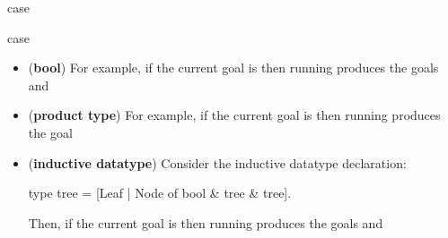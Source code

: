 \begin{tactic}{case}
\begin{tsyntax}{case}
\begin{itemize}
    \item (\textbf{bool})
    For example, if the current goal is
     then
    running 
    produces the goals
    and

    \item (\textbf{product type})
    For example, if the current goal is
     then
    running 
    produces the goal

    \item (\textbf{inductive datatype})
    Consider the inductive datatype declaration:
\begin{easycrypt}{}{}
type tree = [Leaf | Node of bool & tree & tree].
\end{easycrypt}
    Then, if the current goal is
     then
    running 
    produces the goals
    and
    \end{itemize}
  \end{tsyntax}
\end{tactic}
